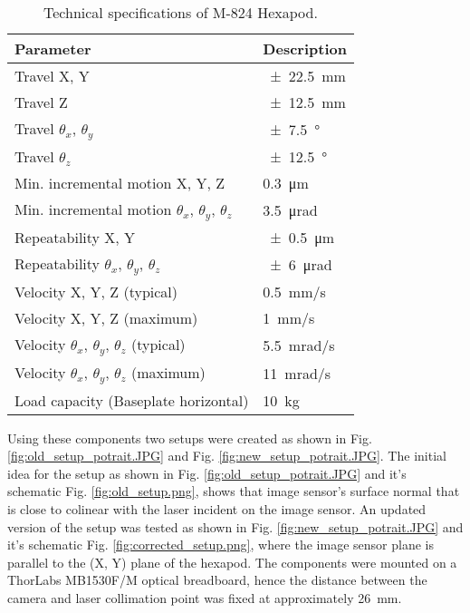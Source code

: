 \begin{table}[h]
    \centering
    \footnotesize
    \renewcommand{\arraystretch}{1.2}
    \begin{tabular}{p{7cm}p{3cm}}
        \toprule
        \textbf{Parameter} & \textbf{Description} \\
        \midrule
        Travel X, Y & \SI{\pm22.5}{\milli\meter} \\        
        Travel Z & \SI{\pm12.5}{\milli\meter} \\        
        Travel $\theta_x$, $\theta_y$ & \SI{\pm7.5}{\degree} \\        
        Travel $\theta_z$ & \SI{\pm12.5}{\degree} \\        
        Min. incremental motion X, Y, Z & \SI{0.3}{\micro\meter} \\
        Min. incremental motion $\theta_x$, $\theta_y$, $\theta_z$ & \SI{3.5}{\micro\radian} \\
        Repeatability X, Y & \SI{\pm0.5}{\micro\meter} \\
        Repeatability $\theta_x$, $\theta_y$, $\theta_z$ & \SI{\pm6}{\micro\radian} \\
        Velocity X, Y, Z (typical) & \SI{0.5}{\milli\meter/\second} \\
        Velocity X, Y, Z (maximum) & \SI{1}{\milli\meter/\second} \\
        Velocity $\theta_x$, $\theta_y$, $\theta_z$ (typical) & \SI{5.5}{\milli\radian/\second} \\
        Velocity $\theta_x$, $\theta_y$, $\theta_z$ (maximum) & \SI{11}{\milli\radian/\second} \\
        Load capacity (Baseplate horizontal) & \SI{10}{\kilo\gram} \\
        \bottomrule
    \end{tabular}
    \caption{Technical specifications of M-824 Hexapod. \cite{hexapod_manual}}
    \label{table:technical_specifications_hexapod}
\end{table}

\vspace{5mm}

\noindent Using these components two setups were created as shown in Fig. \ref{fig:old_setup_potrait.JPG} and Fig. \ref{fig:new_setup_potrait.JPG}. The initial idea for the setup as shown in Fig. \ref{fig:old_setup_potrait.JPG} and it's schematic Fig. \ref{fig:old_setup.png}, shows that image sensor's surface normal that is close to colinear with the laser incident on the image sensor. An updated version of the setup was tested as shown in Fig. \ref{fig:new_setup_potrait.JPG} and it's schematic Fig. \ref{fig:corrected_setup.png}, where the image sensor plane is parallel to the (X, Y) plane of the hexapod. The components were mounted on a ThorLabs MB1530F/M optical breadboard, hence the distance between the camera and laser collimation point was fixed at approximately \SI{26}{\milli\meter}.  

